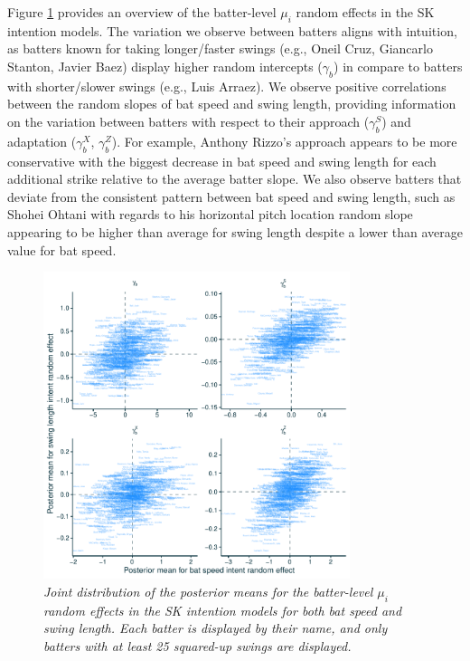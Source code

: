\documentclass{article}
\begin{document}
      Figure \ref{fig:intent-re} provides an overview of the batter-level $\mu_i$ random effects in the SK intention models. The variation we observe between batters aligns with intuition, as batters known for taking longer/faster swings (e.g., Oneil Cruz, Giancarlo Stanton, Javier Baez) display higher random intercepts ($\gamma_b$) in compare to batters with shorter/slower swings (e.g., Luis Arraez). We observe positive correlations between the random slopes of bat speed and swing length, providing information on the variation between batters with respect to their approach ($\gamma_b^S$) and adaptation ($\gamma_b^X$, $\gamma_b^Z$). For example, Anthony Rizzo's approach appears to be more conservative with the biggest decrease in bat speed and swing length for each additional strike relative to the average batter slope. We also observe batters that deviate from the consistent pattern between bat speed and swing length, such as Shohei Ohtani with regards to his horizontal pitch location random slope appearing to be higher than average for swing length despite a lower than average value for bat speed. 
      
      \begin{figure}
        \centering
        \includegraphics[width = 0.8\textwidth]{../../figures/intent_re.pdf}
        \caption{\it Joint distribution of the posterior means for the batter-level $\mu_i$ random effects in the SK intention models for both bat speed and swing length. Each batter is displayed by their name, and only batters with at least 25 squared-up swings are displayed.}
        \label{fig:intent-re}
      \end{figure}
        
\end{document}
